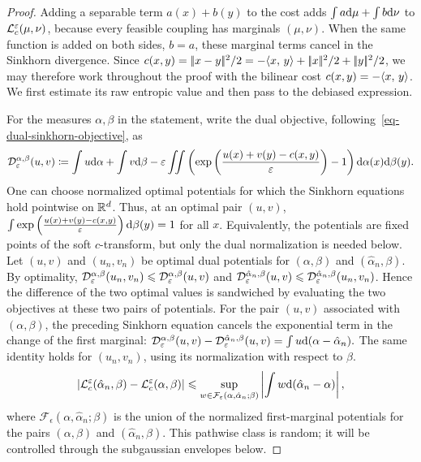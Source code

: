 \begin{proof}
Adding a separable term \(a(x)+b(y)\) to the cost adds
$\int a\mathrm{d}\mu+\int b\mathrm{d}\nu$ to $\mathcal{L}_c^\varepsilon(\mu,\nu)$, because every feasible coupling has marginals $(\mu,\nu)$. When the same function is added on both sides, $b=a$, these marginal terms cancel in the Sinkhorn divergence. Since
$c(x,y)=|\!| x-y |\!|^2/2=-\langle x,\,y\rangle+|\!| x |\!|^2/2+|\!| y |\!|^2/2$, we may therefore work throughout the proof with the bilinear cost $c(x,y)=-\langle x,\,y\rangle$. We first estimate its raw entropic value and then pass to the debiased expression.

For the measures \(\alpha,\beta\) in the statement, write the dual objective, following~\eqref{eq-dual-sinkhorn-objective}, as
\[
\mathcal{D}_\varepsilon^{\alpha,\beta}(u,v)
\coloneqq
\int u\mathrm{d}\alpha+\int v\mathrm{d}\beta
-\varepsilon\iint
\left(
\exp\left(\frac{u(x)+v(y)-c(x,y)}{\varepsilon}\right)-1
\right)
\mathrm{d}\alpha(x)\mathrm{d}\beta(y).
\]
One can choose normalized optimal potentials for which the Sinkhorn equations hold pointwise on \(\mathbb{R}^d\). Thus, at an optimal pair \((u,v)\),
$\int \exp\left(\frac{u(x)+v(y)-c(x,y)}{\varepsilon}\right) \mathrm{d}\beta(y) =1$ for all $x$.
Equivalently, the potentials are fixed points of the soft \(c\)-transform, but only the dual normalization is needed below.
Let \((u,v)\) and \((u_n,v_n)\) be optimal dual potentials for \((\alpha,\beta)\) and \((\hat\alpha_n,\beta)\). By optimality,
$\mathcal{D}_\varepsilon^{\alpha,\beta}(u_n,v_n) \leqslant \mathcal{D}_\varepsilon^{\alpha,\beta}(u,v)$ and $\mathcal{D}_\varepsilon^{\hat\alpha_n,\beta}(u,v) \leqslant \mathcal{D}_\varepsilon^{\hat\alpha_n,\beta}(u_n,v_n)$.
Hence the difference of the two optimal values is sandwiched by evaluating the two objectives at these two pairs of potentials. For the pair \((u,v)\) associated with \((\alpha,\beta)\), the preceding Sinkhorn equation cancels the exponential term in the change of the first marginal:
\(\mathcal{D}_\varepsilon^{\alpha,\beta}(u,v) - \mathcal{D}_\varepsilon^{\hat\alpha_n,\beta}(u,v) = \int u\mathrm{d}(\alpha-\hat\alpha_n).\)
The same identity holds for \((u_n,v_n)\), using its normalization with respect to \(\beta\).
\[
\left\lvert\mathcal{L}_c^\varepsilon(\hat\alpha_n,\beta)-\mathcal{L}_c^\varepsilon(\alpha,\beta)\right\rvert
\leqslant
\sup_{w\in\mathcal F_\varepsilon(\alpha,\hat\alpha_n;\beta)}
\left\lvert\int w\mathrm{d}(\hat\alpha_n-\alpha)\right\rvert,
\]
where \(\mathcal F_\epsilon(\alpha,\hat\alpha_n;\beta)\) is the union of the normalized first-marginal potentials for the pairs \((\alpha,\beta)\) and \((\hat\alpha_n,\beta)\). This pathwise class is random; it will be controlled through the subgaussian envelopes below.


\end{proof}
